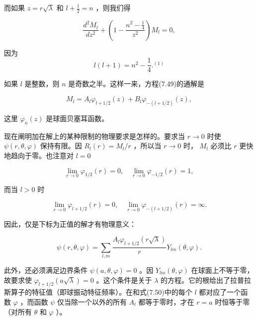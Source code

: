 而如果 $z = r \sqrt{\lambda}$ 和 $l + \frac{1}{2} = n$ ，则我们得

\begin{equation*}
\frac {d ^ {2} M _ {l}}{d z ^ {2}} + \left(1 - \frac {n ^ {2} - \frac {1}{4}}{z ^ {2}}\right) M _ {l} = 0,\tag{7.49}
\end{equation*}

因为
\begin{equation*}
l (l + 1) = n ^ {2} - \frac {1}{4}. ^ {(1)}
\end{equation*}

如果 $l$ 是整数，则 $n$ 是奇数之半。这样一来，方程(7.49)的通解是

\begin{equation*}
M _ {l} = A _ {l} \varphi_ {l + 1 / 2} (z) + B _ {l} \varphi_ {- (l + 1 / 2)} (z),
\end{equation*}

这里 $\varphi_{n}(z)$ 是球面贝塞耳函数。

现在阐明加在解上的某种限制的物理要求是怎样的。要求当 $r \to 0$ 时使 $\psi(r, \theta, \varphi)$ 保持有限。因 $R_{l}(r) = M_{l} / r$ ，所以当 $r \to 0$ 时， $M_{l}$ 必须比 $r$ 更快地趋向于零。也注意对 $l = 0$

\begin{equation*}
\lim _ {r \rightarrow 0} \varphi_ {1 / 2} (r) = 0, \quad \lim _ {r \rightarrow 0} \varphi_ {- 1 / 2} (r) = 1,
\end{equation*}

而当 $l > 0$ 时

\begin{equation*}
\lim _ {r \rightarrow 0} \varphi_ {l + 1 / 2} (r) = 0, \quad \lim _ {r \rightarrow 0} \varphi_ {- (l + 1 / 2)} (r) = \infty .
\end{equation*}

因此，仅是下标为正值的解才有物理意义：

\begin{equation*}
\psi (r, \theta , \varphi) = \sum_ {l, m} \frac {A _ {l} \varphi_ {l + 1 / 2} (r \sqrt {\lambda})}{r} Y _ {l m} (\theta , \varphi).\tag{7.50}
\end{equation*}

此外，还必须满足边界条件 $\psi(a, \theta, \varphi) = 0$ 。因 $Y_{lm}(\theta, \varphi)$ 在球面上不等于零，故要求使 $\varphi_{l+1/2}(a\sqrt{\lambda}) = 0$ 。这个条件是关于 $\lambda$ 的方程。它的根给出了拉普拉斯算子的特征值（即球振动特征频率）。在和式(7.50)中的每个 $l$ 都对应了一个函数 $\varphi$ ，而函数 $\psi$ 仅当除一个以外的所有 $A_l$ 都等于零时，才在 $r = a$ 时恒等于零（对所有 $\theta$ 和 $\varphi$ ）。

